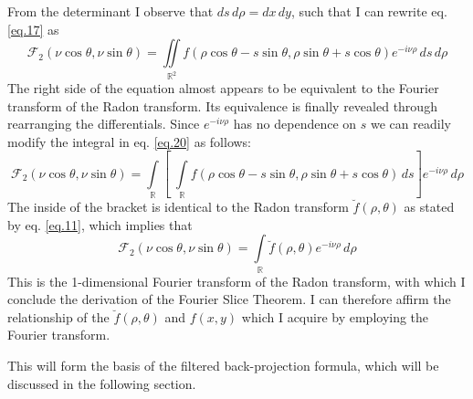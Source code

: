 \documentclass[12pt]{article}
\begin{document}
From the determinant I observe that $ds \,d\rho = dx \,dy$, such that I can rewrite eq. \ref{eq.17} as
\begin{equation}\label{eq.20}
	\mathcal{F}_2(\nu\cos{\theta}, \nu\sin{\theta}) = \iint\limits_{\mathbb{R}^2} f(\rho\cos{\theta}- s\sin{\theta}, \rho\sin{\theta} + s\cos{\theta}) e^{-i\nu\rho} \, ds \, d\rho 
\end{equation}
The right side of the equation almost appears to be equivalent to the Fourier transform of the Radon transform. Its equivalence is finally revealed through rearranging the differentials. Since $e^{-i\nu\rho}$ has no dependence on $s$ we can readily modify the integral in eq. \ref{eq.20} as follows:
\begin{equation}\label{eq.21}
	\mathcal{F}_2(\nu\cos{\theta}, \nu\sin{\theta}) = \int\limits_{\mathbb{R}}\left[\;\int\limits_{\mathbb{R}} f(\rho\cos{\theta}- s\sin{\theta}, \rho\sin{\theta} + s\cos{\theta})\, ds \right] e^{-i\nu\rho} \, d\rho 
\end{equation}
The inside of the bracket is identical to the  Radon transform $\breve{f}(\rho, \theta)$ as stated by eq. \ref{eq.11}, which implies that
\begin{equation}\label{eq:21}
	\mathcal{F}_2(\nu\cos{\theta}, \nu\sin{\theta}) = \int\limits_{\mathbb{R}} \breve{f}(\rho, \theta) e^{-i\nu\rho}\, d\rho
\end{equation}
This is the 1-dimensional Fourier transform of the Radon transform, with which I conclude the derivation of the Fourier Slice Theorem. I can therefore affirm the relationship of the $\breve{f}(\rho, \theta)$ and $f(x,y)$ which I acquire by employing the Fourier transform. 

This will form the basis of the filtered back-projection formula, which will be discussed in the following section.  
\end{document}
